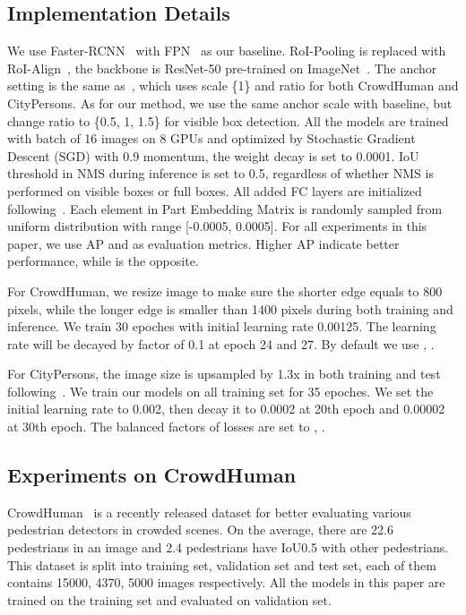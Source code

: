 \documentclass[10pt,twocolumn,letterpaper]{article}
\begin{document}
\subsection{Implementation Details}
We use Faster-RCNN~\cite{ren2015faster} with FPN~\cite{lin2017feature} as our baseline. RoI-Pooling is replaced with RoI-Align~\cite{he2017mask}, the backbone is ResNet-50 pre-trained on ImageNet~\cite{russakovsky2015imagenet}. The anchor setting is the same as~\cite{wang2018repulsion,chu2020crowddet}, which uses scale \{1\} and ratio  for both CrowdHuman and CityPersons. As for our method, we use the same anchor scale with baseline, but change ratio to \{0.5, 1, 1.5\} for visible box detection. All the models are trained with batch of 16 images on 8 GPUs and  optimized by Stochastic Gradient Descent (SGD) with 0.9 momentum, the weight decay is set to 0.0001. IoU threshold in NMS during inference is set to 0.5, regardless of whether NMS is performed on visible boxes or full boxes. All added FC layers are initialized following~\cite{lin2017feature}. Each element in Part Embedding Matrix  is randomly sampled from uniform distribution with range [-0.0005, 0.0005]. For all experiments in this paper, we use AP and  as evaluation metrics. Higher AP indicate better performance, while  is the opposite.

For CrowdHuman, we resize image to make sure the shorter edge equals to 800 pixels, while the longer edge is smaller than 1400 pixels during both training and inference. We train 30 epoches with initial learning rate 0.00125. The learning rate will be decayed by factor of 0.1 at epoch 24 and 27. By default we use , .

For CityPersons, the image size is upsampled by 1.3x in both training and test following~\cite{zhang2017citypersons}. We train our models on all training set for 35 epoches. We set the initial learning rate to 0.002, then decay it to 0.0002 at 20th epoch and 0.00002 at 30th epoch. The balanced factors of losses are set to , .

\subsection{Experiments on CrowdHuman}
\label{sec:exp_crowdhuman}
CrowdHuman~\cite{shao2018crowdhuman} is a recently released dataset for better evaluating various pedestrian detectors in crowded scenes. On the average, there are 22.6 pedestrians in an image and 2.4 pedestrians have IoU0.5 with other pedestrians. This dataset is split into training set, validation set and test set, each of them contains 15000, 4370, 5000 images respectively. All the models in this paper are trained on the training set and evaluated on validation set.
\end{document}
